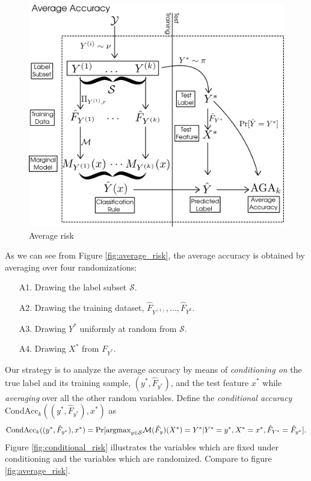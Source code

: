 \begin{figure}[h]
\centering
\includegraphics[scale = 0.3]{../extrapolation_simple/average_risk.png}
\caption{Average risk}\label{fig:average_risk2}
\end{figure}

\fi

As we can see from Figure \ref{fig:average_risk}, the average accuracy is
obtained by averaging over four randomizations:
\begin{enumerate}
\item[A1.] Drawing the label subset $\mathcal{S}$.
\item[A2.] Drawing the training dataset, $\hat{F}_{Y^{(1)}},\hdots, \hat{F}_{Y^{k}}.$
\item[A3.] Drawing $Y^*$ uniformly at random from $\mathcal{S}$.
\item[A4.] Drawing $X^*$ from $F_{Y^*}$.
\end{enumerate}


Our strategy is to analyze the average accuracy by
means of \emph{conditioning on} the true label and its training
sample, $(y^*, \hat{F}_{y^*})$, and the test feature $x^*$
while \emph{averaging} over all the other random variables.  Define
the \emph{conditional accuracy} $\text{CondAcc}_k((y^*, \hat{F}_{y^*}), x^*)$ as
\[
\text{CondAcc}_k((y^*, \hat{F}_{y^*}), x^*) = \Pr[\text{argmax}_{y \in \mathcal{S}} \mathcal{M}(\hat{F}_y)(X^*) = Y^* |Y^*=y^*, X^* = x^*, \hat{F}_{Y^*} = \hat{F}_{y^*}].
\]
Figure \ref{fig:conditional_risk} illustrates the variables which are
fixed under conditioning and the variables which are randomized.
Compare to figure \ref{fig:average_risk}.

